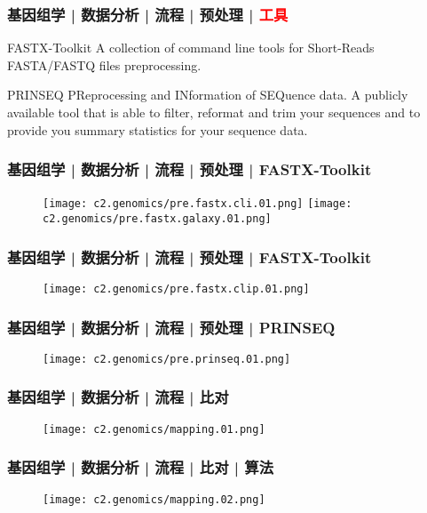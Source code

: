 \begin{frame}
  \frametitle{基因组学 | 数据分析 | 流程 | 预处理 | \textcolor{red}{工具}}
  \begin{block}{FASTX-Toolkit}
    A collection of command line tools for Short-Reads FASTA/FASTQ files preprocessing.
  \end{block}
  \pause
  \begin{block}{PRINSEQ}
    PReprocessing and INformation of SEQuence data. A publicly available tool that is able to filter, reformat and trim your sequences and to provide you summary statistics for your sequence data.
  \end{block}
\end{frame}

\begin{frame}
  \frametitle{基因组学 | 数据分析 | 流程 | 预处理 | FASTX-Toolkit}
  \begin{figure}
    \centering
    \texttt{[image: c2.genomics/pre.fastx.cli.01.png]}
    \texttt{[image: c2.genomics/pre.fastx.galaxy.01.png]}
  \end{figure}
\end{frame}

\begin{frame}
  \frametitle{基因组学 | 数据分析 | 流程 | 预处理 | FASTX-Toolkit}
  \begin{figure}
    \centering
    \texttt{[image: c2.genomics/pre.fastx.clip.01.png]}
  \end{figure}
\end{frame}

\begin{frame}
  \frametitle{基因组学 | 数据分析 | 流程 | 预处理 | PRINSEQ}
  \begin{figure}
    \centering
    \texttt{[image: c2.genomics/pre.prinseq.01.png]}
  \end{figure}
\end{frame}

\begin{frame}
  \frametitle{基因组学 | 数据分析 | 流程 | 比对}
  \begin{figure}
    \centering
    \texttt{[image: c2.genomics/mapping.01.png]}
  \end{figure}
\end{frame}

\begin{frame}
  \frametitle{基因组学 | 数据分析 | 流程 | 比对 | 算法}
  \begin{figure}
    \centering
    \texttt{[image: c2.genomics/mapping.02.png]}
  \end{figure}
\end{frame}

